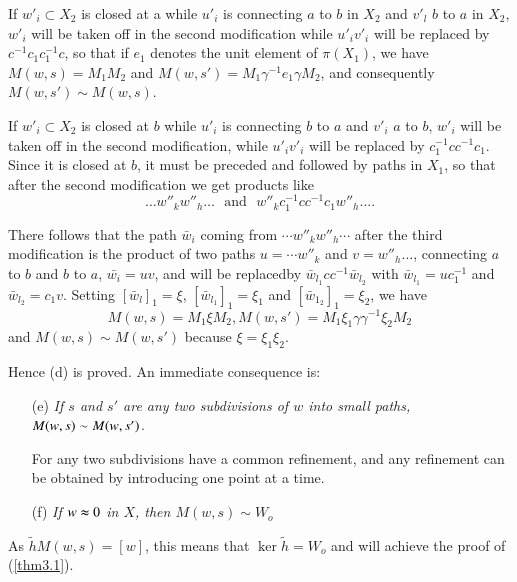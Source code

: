   If $w'_i  \subset X_2$ is closed at a while $u'_i$ is connecting $a$
  to $b$ in $X_2$ and $v'_l$ $b$ to  $a$ in $X_2$, $w'_i$ will be
  taken off in the second modification while $u'_i  v'_i$ will be
  replaced by $c^{-1} c_1 c^{-1}_1 c$, so that if $e_1$ denotes the
  unit element of $\pi (X_1)$, we have $M(w,s) = M_1 M_2$ and
  $M(w,s')=M_1 \gamma^{-1} e_1 \gamma M_2$, and consequently $M(w,s')
  \sim M(w,s)$. 
  
  If $w'_i \subset X_2$ is closed at $b$ while $u'_i$ is connecting
  $b$ to $a$ and $v'_i$ $a$ to $b$, $w'_i$ will be taken off in the second
  modification, while $u'_i v'_i$ will be replaced by $c^{-1}_1 c
  c^{-1} c_1$. Since it is closed at $b$, it must be preceded and
  followed by paths in $X_1$, so that after the second modification we
  get products like 
  $$
   \ldots w''_k w''_ h \ldots \text{~ and~ } w''_k c^{-1}_1 c c^{-1}c_1
   w''_h \ldots. 
  $$
  
There follows that the path $\bar{w}_i$ coming from $\cdots w''_k
w''_h \cdots$ after the third modification is the product of two paths
$u = \cdots w''_k$ and $v=  w''_h \ldots$, connecting $a$ to $b$ and
$b$ to $a$, $\bar{w_i}= uv$, and will be replaced\pageoriginale by
$\bar{w}_{l_1} cc^{-1} \bar{w}_{l_2}$ with $\bar{w}_{l_1} =
uc^{-1}_1$ and $\bar{w}_{l_2}= c_1 v$. Setting $[\bar{w}_l]_1 = \xi$,
$[\bar{w}_{l_1}]_1 = \xi_1$ and $[\bar{w}_{1_2}]_1 = \xi_2$, we have  
$$
M(w,s) =  M_1 \xi M_2, M(w,s') = M_1 \xi_1 \gamma \gamma^{-1} \xi_2
M_2 
$$ 
and $M(w,s) \sim M(w,s')$ because $\xi= \xi_1\xi_2$.


Hence (d) is proved. An immediate consequence is:
\begin{enumerate}
\item[(e)] \textit{If $s$ and $s'$ are any two subdivisions of $w$ into
  small paths, $M(w,s)\break \sim M (w,s')$}. 

For any two subdivisions have a common refinement, and any refinement
can be obtained by introducing one point at a time. 

\item[(f)] \textit{If $w \thickapprox 0$ in $X$, then $M(w,s)\sim W_o$}
\end{enumerate}

As $\tilde{h}M(w,s) = [w]$, this means that $\ker \tilde{h} = W_o$ and
will achieve the proof of (\ref{thm3.1}). 

